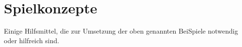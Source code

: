 \chapter{Spielkonzepte}

Einige Hilfsmittel, die zur Umsetzung der oben genannten BeiSpiele notwendig oder
hilfreich sind.




















\newpage
